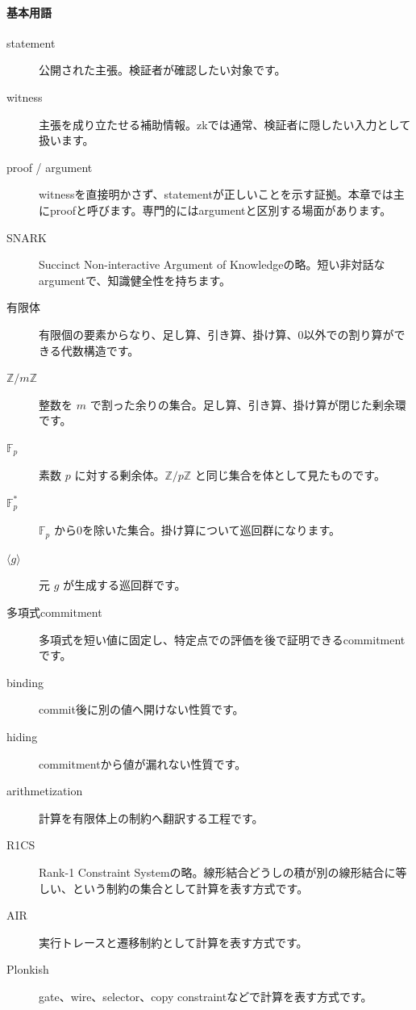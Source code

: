 \documentclass[a4paper,11pt]{ltjsarticle}
\newcommand{\F}{\mathbb{F}}
\newcommand{\Z}{\mathbb{Z}}
\begin{document}
\paragraph*{基本用語}
\begin{description}
  \item[statement] 公開された主張。検証者が確認したい対象です。
  \item[witness] 主張を成り立たせる補助情報。zkでは通常、検証者に隠したい入力として扱います。
  \item[proof / argument] witnessを直接明かさず、statementが正しいことを示す証拠。本章では主にproofと呼びます。専門的にはargumentと区別する場面があります。
  \item[SNARK] Succinct Non-interactive Argument of Knowledgeの略。短い非対話なargumentで、知識健全性を持ちます。
  \item[有限体] 有限個の要素からなり、足し算、引き算、掛け算、0以外での割り算ができる代数構造です。
  \item[\(\Z/m\Z\)] 整数を \(m\) で割った余りの集合。足し算、引き算、掛け算が閉じた剰余環です。
  \item[\(\F_p\)] 素数 \(p\) に対する剰余体。\(\Z/p\Z\) と同じ集合を体として見たものです。
  \item[\(\F_p^\ast\)] \(\F_p\) から0を除いた集合。掛け算について巡回群になります。
  \item[\(\langle g\rangle\)] 元 \(g\) が生成する巡回群です。
  \item[多項式commitment] 多項式を短い値に固定し、特定点での評価を後で証明できるcommitmentです。
  \item[binding] commit後に別の値へ開けない性質です。
  \item[hiding] commitmentから値が漏れない性質です。
  \item[arithmetization] 計算を有限体上の制約へ翻訳する工程です。
  \item[R1CS] Rank-1 Constraint Systemの略。線形結合どうしの積が別の線形結合に等しい、という制約の集合として計算を表す方式です。
  \item[AIR] 実行トレースと遷移制約として計算を表す方式です。
  \item[Plonkish] gate、wire、selector、copy constraintなどで計算を表す方式です。
\end{description}
\end{document}
